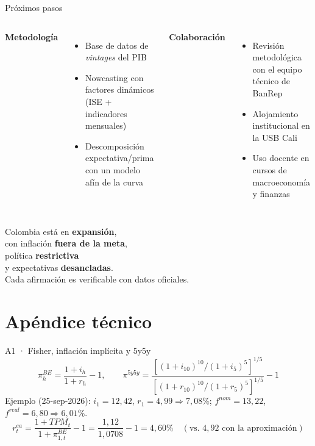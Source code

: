 \documentclass[aspectratio=169,11pt]{beamer}
\begin{document}
\begin{frame}{Próximos pasos}
\begin{columns}[T]
\textbf{Metodología}
\begin{itemize}
\item Base de datos de \emph{vintages} del PIB
\item Nowcasting con factores dinámicos (ISE + indicadores mensuales)
\item Descomposición expectativa/prima con un modelo afín de la curva
\end{itemize}
\textbf{Colaboración}
\begin{itemize}
\item Revisión metodológica con el equipo técnico de BanRep
\item Alojamiento institucional en la USB Cali
\item Uso docente en cursos de macroeconomía y finanzas
\end{itemize}
\end{columns}
\end{frame}

\begin{frame}[standout]
Colombia está en \textbf{expansión},\\ con inflación \textbf{fuera de la meta},\\ política \textbf{restrictiva}\\ y expectativas \textbf{desancladas}.\\[1em]
{\normalsize Cada afirmación es verificable con datos oficiales.}
\end{frame}

\appendix
\section*{Apéndice técnico}

\begin{frame}{A1 · Fisher, inflación implícita y 5y5y}
\[
\pi^{BE}_h=\frac{1+i_h}{1+r_h}-1,\qquad
\pi^{5y5y}=\frac{\left[(1+i_{10})^{10}/(1+i_5)^{5}\right]^{1/5}}{\left[(1+r_{10})^{10}/(1+r_5)^{5}\right]^{1/5}}-1
\]
\small Ejemplo (25-sep-2026): $i_1=12{,}42$, $r_1=4{,}99 \Rightarrow 7{,}08\%$; $f^{nom}=13{,}22$, $f^{real}=6{,}80 \Rightarrow 6{,}01\%$.
\[
r^{ea}_t=\frac{1+TPM_t}{1+\pi^{BE}_{1,t}}-1=\frac{1{,}12}{1{,}0708}-1=4{,}60\%\quad(\text{vs. }4{,}92\text{ con la aproximación})
\]
\end{frame}
\end{document}
